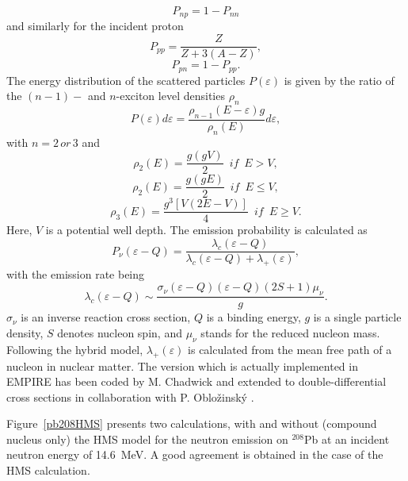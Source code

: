 \begin{equation}
P_{np}=1-P_{nn}  \label{Pnp}
\end{equation}
and similarly for the incident proton
\begin{equation}
P_{pp}=\frac{Z}{Z+3(A-Z)},  \label{Ppp}
\end{equation}
\begin{equation}
P_{pn}=1-P_{pp}.  \label{Ppn}
\end{equation}
The energy distribution of the scattered particles $P(\varepsilon)$ is given
by the ratio of the $(n-1)-$ and $n$-exciton level densities%
 $\rho_{n}$
\begin{equation}
P(\varepsilon)d\varepsilon=%
\frac{\rho_{n-1}(E-\varepsilon)g}{\rho_{n}(E)}d\varepsilon,  \label{Penergy}
\end{equation}
with $n=2\, or\,3$ and%
\begin{equation}
\rho_{2}(E)=\frac{g(gV)}{2}\,\,\, if\,\,\, E>V,  \label{ro2u}
\end{equation}
\begin{equation}
\rho_{2}(E)=\frac{g(gE)}{2}\,\,\, if\,\,\, E\leq V,  \label{ro2d}
\end{equation}
\begin{equation}
\rho_{3}(E)=\frac{g^{3}\left[V(2E-V)\right]}{4}\,\,\, if\,\,\, E\geq V.
\label{ro3}
\end{equation}
Here, $V$ is a potential well depth. The emission probability is calculated
as
\begin{equation}
P_{\nu}(\varepsilon-Q)=\frac{\lambda_{c}(\varepsilon-Q)}{\lambda_{c}(%
\varepsilon-Q)+\lambda_{+}(\varepsilon)},  \label{Pnu}
\end{equation}
with the emission rate being
\begin{equation}
\lambda_{c}(\varepsilon-Q)\sim\frac{\sigma_{\nu}(\varepsilon-Q)(%
\varepsilon-Q)(2S+1)\mu_{\nu}}{g}.  \label{lambdac}
\end{equation}
$\sigma_{\nu}$ is an inverse reaction cross section, $Q$ is a binding
energy, $g$ is a single particle density, $S$ denotes nucleon spin, and $%
\mu_{\nu}$ stands for the reduced nucleon mass. Following the hybrid%
 model, $\lambda_{+}(\varepsilon)$ is calculated from the mean
free path of a nucleon in nuclear matter. The version which is actually
implemented in EMPIRE has been coded by M. Chadwick and extended to
double-differential cross sections in collaboration with P. Oblo\v zinsk\' y
\cite{DDHMScode}.

Figure~\ref{pb208HMS} presents two calculations, with and without (compound
nucleus only) the HMS model for the neutron emission on $^{208}$Pb at an
incident neutron energy of 14.6~MeV. A good agreement is obtained in the
case of the HMS calculation.

